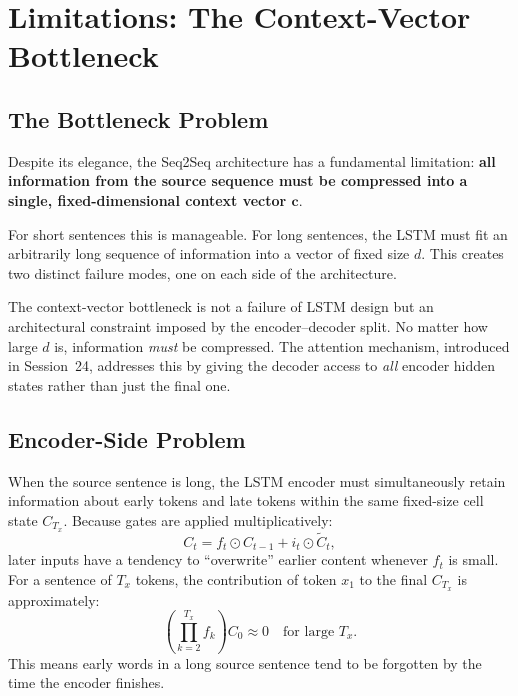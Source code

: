 \documentclass[12pt,a4paper]{article}
\begin{document}
\section{Limitations: The Context-Vector Bottleneck}
\label{sec:limitations}

\subsection{The Bottleneck Problem}

Despite its elegance, the Seq2Seq architecture has a fundamental limitation: \textbf{all
information from the source sequence must be compressed into a single, fixed-dimensional
context vector $\mathbf{c}$}.

For short sentences this is manageable. For long sentences, the LSTM must fit an arbitrarily
long sequence of information into a vector of fixed size $d$. This creates two distinct failure
modes, one on each side of the architecture.

\begin{keyinsight}
  The context-vector bottleneck is not a failure of LSTM design but an architectural
  constraint imposed by the encoder--decoder split. No matter how large $d$ is, information
  \emph{must} be compressed. The attention mechanism, introduced in Session~24, addresses this
  by giving the decoder access to \emph{all} encoder hidden states rather than just the final
  one.
\end{keyinsight}

\subsection{Encoder-Side Problem}

When the source sentence is long, the LSTM encoder must simultaneously retain information about
early tokens and late tokens within the same fixed-size cell state $C_{T_x}$. Because gates
are applied multiplicatively:
\begin{equation}
  C_t = f_t \odot C_{t-1} + i_t \odot \tilde{C}_t,
  \label{eq:cell_overwrite}
\end{equation}
later inputs have a tendency to ``overwrite'' earlier content whenever $f_t$ is small. For a
sentence of $T_x$ tokens, the contribution of token $x_1$ to the final $C_{T_x}$ is
approximately:
\begin{equation}
  \left(\prod_{k=2}^{T_x} f_k\right) C_0 \approx 0 \quad \text{for large } T_x.
  \label{eq:forget_product}
\end{equation}
This means early words in a long source sentence tend to be forgotten by the time the encoder
finishes.
\end{document}
